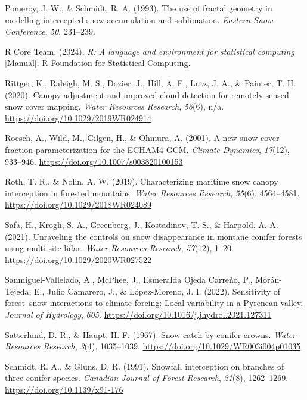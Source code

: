 \documentclass[
  letterpaper,
  DIV=11,
  numbers=noendperiod]{scrartcl}
\newlength{\cslhangindent}
\newenvironment{CSLReferences}[2] %
 {\begin{list}{}{%
  \setlength{\itemindent}{0pt}
  \setlength{\leftmargin}{0pt}
  \setlength{\parsep}{0pt}
  \ifodd #1
   \setlength{\leftmargin}{\cslhangindent}
   \setlength{\itemindent}{-1\cslhangindent}
  \fi
  \setlength{\itemsep}{#2\baselineskip}}}
 {\end{list}}
\begin{document}
\begin{CSLReferences}{1}{0}
Pomeroy, J. W., \& Schmidt, R. A. (1993). The use of fractal geometry in
modelling intercepted snow accumulation and sublimation. \emph{Eastern
Snow Conference}, \emph{50}, 231--239.

R Core Team. (2024). \emph{R: A language and environment for statistical
computing} {[}Manual{]}. R Foundation for Statistical Computing.

Rittger, K., Raleigh, M. S., Dozier, J., Hill, A. F., Lutz, J. A., \&
Painter, T. H. (2020). Canopy adjustment and improved cloud detection
for remotely sensed snow cover mapping. \emph{Water Resources Research},
\emph{56}(6), n/a. \url{https://doi.org/10.1029/2019WR024914}

Roesch, A., Wild, M., Gilgen, H., \& Ohmura, A. (2001). A new snow cover
fraction parameterization for the {ECHAM4 GCM}. \emph{Climate Dynamics},
\emph{17}(12), 933--946. \url{https://doi.org/10.1007/s003820100153}

Roth, T. R., \& Nolin, A. W. (2019). Characterizing maritime snow canopy
interception in forested mountains. \emph{Water Resources Research},
\emph{55}(6), 4564--4581. \url{https://doi.org/10.1029/2018WR024089}

Safa, H., Krogh, S. A., Greenberg, J., Kostadinov, T. S., \& Harpold, A.
A. (2021). Unraveling the controls on snow disappearance in montane
conifer forests using multi-site lidar. \emph{Water Resources Research},
\emph{57}(12), 1--20. \url{https://doi.org/10.1029/2020WR027522}

Sanmiguel-Vallelado, A., McPhee, J., Esmeralda Ojeda Carreño, P.,
Morán-Tejeda, E., Julio Camarero, J., \& López-Moreno, J. I. (2022).
Sensitivity of forest--snow interactions to climate forcing: {Local}
variability in a {Pyrenean} valley. \emph{Journal of Hydrology},
\emph{605}. \url{https://doi.org/10.1016/j.jhydrol.2021.127311}

Satterlund, D. R., \& Haupt, H. F. (1967). Snow catch by conifer crowns.
\emph{Water Resources Research}, \emph{3}(4), 1035--1039.
\url{https://doi.org/10.1029/WR003i004p01035}

Schmidt, R. A., \& Gluns, D. R. (1991). Snowfall interception on
branches of three conifer species. \emph{Canadian Journal of Forest
Research}, \emph{21}(8), 1262--1269.
\url{https://doi.org/10.1139/x91-176}


\end{CSLReferences}
\end{document}
